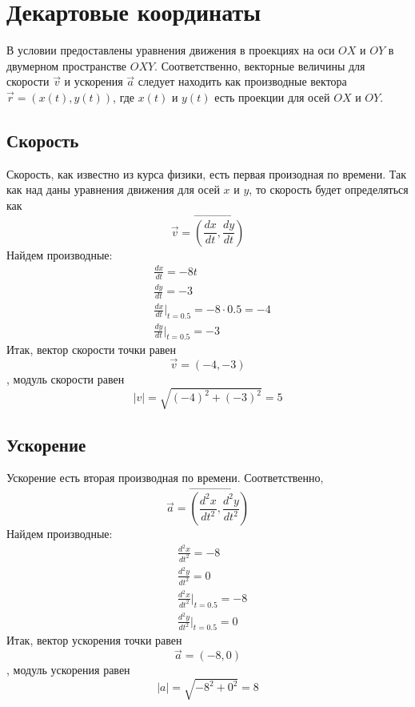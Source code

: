 \section{Декартовые координаты}
В условии предоставлены уравнения движения в проекциях на оси $OX$ и $OY$
в двумерном пространстве $OXY$. Соответственно, векторные величины для
скорости $\vec{v}$ и ускорения $\vec{a}$ следует находить как производные
вектора $\vec{r}=(x(t), y(t))$, где $x(t)$ и $y(t)$ есть проекции
для осей $OX$ и $OY$.

\subsection{Скорость}
Скорость, как известно из курса физики, есть первая произодная по времени.
Так как над даны уравнения движения для осей $x$ и $y$, то скорость будет
определяться как $$ \vec{v} = \vec{(\frac{dx}{dt}, \frac{dy}{dt})} $$
Найдем производные:
\begin{align}
    &\frac{dx}{dt} = -8t \\
    &\frac{dy}{dt} = -3 \\
    &\frac{dx}{dt} \bigg|_{t=0.5} = -8 \cdot 0.5 = -4 \\
    &\frac{dy}{dt} \bigg|_{t=0.5} = -3
\end{align}
Итак, вектор скорости точки равен $$ \vec{v} = ( -4, -3 ) $$,
модуль скорости равен $$ \left|{v}\right| = \sqrt{(-4)^{2} + (-3)^{2}} = 5 $$

\subsection{Ускорение}
Ускорение есть вторая производная по времени. Соответственно,
$$ \vec{a} = \vec{(\frac{d^{2}x}{dt^{2}}, \frac{d^{2}y}{dt^{2}})} $$
Найдем производные:
\begin{align}
    &\frac{d^{2}x}{dt^{2}} = -8 \\
    &\frac{d^{2}y}{dt^{2}} = 0 \\
    &\frac{d^{2}x}{dt^{2}} \bigg|_{t=0.5} = -8 \\
    &\frac{d^{2}y}{dt^{2}} \bigg|_{t=0.5} = 0
\end{align}
Итак, вектор ускорения точки равен $$ \vec{a} = ( -8, 0 ) $$,
модуль ускорения равен $$ \left|{a}\right| = \sqrt{-8^{2} + 0^{2}} = 8 $$

